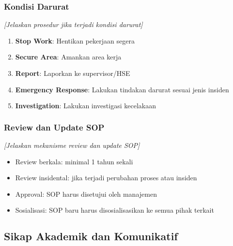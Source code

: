 \vspace{0.5cm}

\subsubsection{Kondisi Darurat}

\textit{[Jelaskan prosedur jika terjadi kondisi darurat]}

\begin{enumerate}
    \item \textbf{Stop Work}: Hentikan pekerjaan segera
    \item \textbf{Secure Area}: Amankan area kerja
    \item \textbf{Report}: Laporkan ke supervisor/HSE
    \item \textbf{Emergency Response}: Lakukan tindakan darurat sesuai jenis insiden
    \item \textbf{Investigation}: Lakukan investigasi kecelakaan
\end{enumerate}

\vspace{0.5cm}

\subsubsection{Review dan Update SOP}

\textit{[Jelaskan mekanisme review dan update SOP]}

\begin{itemize}
    \item Review berkala: minimal 1 tahun sekali
    \item Review insidental: jika terjadi perubahan proses atau insiden
    \item Approval: SOP harus disetujui oleh manajemen
    \item Sosialisasi: SOP baru harus disosialisasikan ke semua pihak terkait
\end{itemize}

\vspace{1cm}

\subsection{Sikap Akademik dan Komunikatif}
\label{subsec:sikap-akademik}


